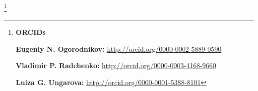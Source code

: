 \RuDate





\newpage



\makeentitle







\thanks{{\bf ORCIDs}



{\bf Eugeniy  N. Ogorodnikov:} \url{http://orcid.org/0000-0002-5889-0590}



{\bf Vladimir P. Radchenko:} \url{http://orcid.org/0000-0003-4168-9660}



{\bf Luiza G. Ungarova:} \url{http://orcid.org/0000-0001-5388-8101}





}











\EngRef

	


